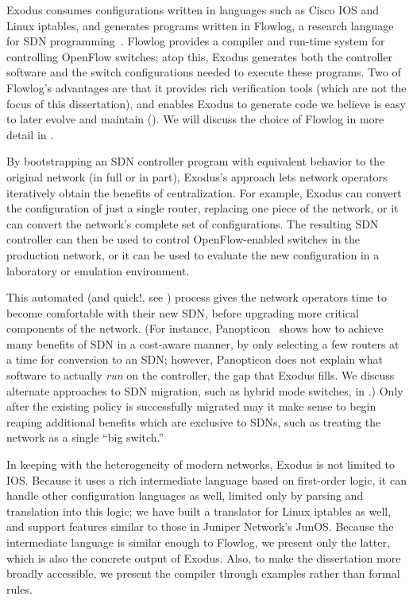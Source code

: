 
\label{sec:introduction}

Exodus consumes configurations written
in languages such as Cisco IOS and Linux iptables, and generates programs written in Flowlog, a research
language for SDN programming~\cite{Nelson:2014flowlog}.  Flowlog
provides a compiler and run-time system for controlling OpenFlow switches;
atop this, Exodus generates both the controller software and the switch
configurations needed to execute these programs.  
Two of Flowlog's advantages are that it provides rich verification tools (which are not the
focus of this dissertation), and enables Exodus to generate code we believe is easy to
later evolve and maintain ().
We will discuss the choice of Flowlog in more detail in . 

By bootstrapping an SDN controller program with equivalent behavior to
the original network (in full or in part), Exodus's approach lets network
operators iteratively obtain the benefits of centralization.  
For example, Exodus can convert the configuration of just a single router, 
replacing one piece of the network, or it can convert the network's complete
set of configurations. The resulting SDN controller can then be used
to control OpenFlow-enabled switches in the production network,
or it can be used to evaluate the new configuration in a laboratory or
emulation environment.

This automated (and quick!, see ) process gives the network operators time to become
comfortable with their new SDN, before upgrading more critical
components of the network. (For instance, Panopticon~\cite{levin13panopticonTR} shows how
to achieve many benefits of SDN in a cost-aware manner, by only selecting
a few routers at a time for conversion to an SDN; however, Panopticon
does not explain what software to actually \emph{run} on the
controller, the gap that Exodus fills. We discuss alternate approaches to
SDN migration, such as hybrid mode switches, in .)  Only
after the existing policy is successfully migrated may it make sense
to begin reaping additional benefits which are exclusive to SDNs, such
as treating the network as a single ``big switch.''

In keeping with the heterogeneity of modern networks,
Exodus is not limited to IOS. Because it uses a rich intermediate
language based on first-order logic, it can handle other configuration
languages as well, limited only by parsing and translation into this
logic; we have built a translator for Linux iptables as well, and
support features similar to those in Juniper Network's JunOS. Because
the intermediate language is similar enough to Flowlog, we present
only the latter, which is also the concrete output of Exodus. Also, to
make the dissertation more broadly accessible, we present the compiler
through examples rather than formal rules.

